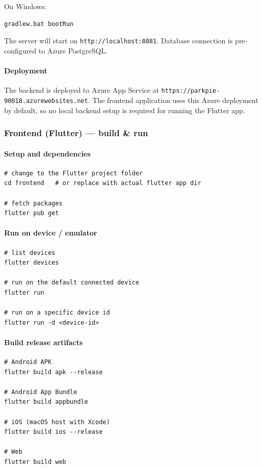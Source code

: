 On Windows:
\begin{verbatim}
gradlew.bat bootRun
\end{verbatim}

The server will start on \texttt{http://localhost:8081}. Database connection is pre-configured to Azure PostgreSQL.

\paragraph{Deployment}
The backend is deployed to Azure App Service at \texttt{https://parkpie-90018.azurewebsites.net}. The frontend application uses this Azure deployment by default, so no local backend setup is required for running the Flutter app.


\subsubsection{Frontend (Flutter) — build \& run}
\paragraph{Setup and dependencies}
\begin{verbatim}
# change to the Flutter project folder
cd frontend   # or replace with actual flutter app dir

# fetch packages
flutter pub get
\end{verbatim}

\paragraph{Run on device / emulator}
\begin{verbatim}
# list devices
flutter devices

# run on the default connected device
flutter run

# run on a specific device id
flutter run -d <device-id>
\end{verbatim}

\paragraph{Build release artifacts}
\begin{verbatim}
# Android APK
flutter build apk --release

# Android App Bundle
flutter build appbundle

# iOS (macOS host with Xcode)
flutter build ios --release

# Web
flutter build web
\end{verbatim}

